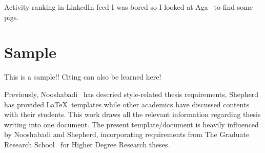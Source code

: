 Activity ranking in LinkedIn feed
I was bored so I looked at Aga~\cite{Aga2014} to find some pigs.

\section{Sample}

This is a sample!! Citing can also be learned here!

Previously, Nooshabadi~\cite{Noo05} has descried style-related thesis
requirements, Shepherd~\cite{She05} has provided \LaTeX\ templates while
other academics have discussed contents with their students.  This work
draws all the relevant information regarding thesis writing into one
document.  The present template/document is heavily influenced by
Nooshabadi and Shepherd, incorporating requirements from The Graduate
Research School~\cite{GRS14} for Higher Degree Research theses.
